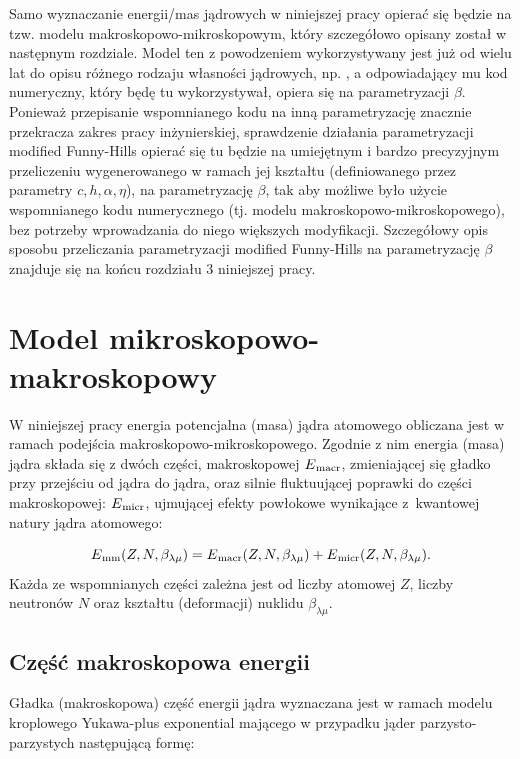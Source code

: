 \documentclass[a4paper,polish,twoside]{article}
\numberwithin{equation}{section}
\begin{document}
Samo wyznaczanie energii/mas jądrowych w niniejszej pracy opierać się będzie na tzw. modelu makroskopowo-mikroskopowym, który szczegółowo opisany został w następnym rozdziale. Model ten z powodzeniem wykorzystywany jest już od wielu lat do opisu różnego rodzaju własności jądrowych, np. \cite{JACHQ,JACHBF,Muntian}, a odpowiadający mu kod numeryczny, który będę tu wykorzystywał, opiera się na parametryzacji $\beta$. Ponieważ przepisanie wspomnianego kodu na inną parametryzację znacznie przekracza zakres pracy inżynierskiej, sprawdzenie działania parametryzacji modified Funny-Hills opierać się tu będzie na umiejętnym i bardzo precyzyjnym przeliczeniu wygenerowanego w ramach jej kształtu (definiowanego przez parametry $c, h, \alpha, \eta$),  na parametryzację $\beta$, tak aby możliwe było użycie wspomnianego kodu numerycznego (tj. modelu makroskopowo-mikroskopowego), bez potrzeby wprowadzania do niego większych modyfikacji. Szczegółowy opis sposobu przeliczania parametryzacji modified Funny-Hills na parametryzację $\beta$ znajduje się na końcu rozdziału 3 niniejszej pracy.

\section{Model mikroskopowo-makroskopowy}

W niniejszej pracy energia potencjalna (masa) jądra atomowego obliczana jest w ramach podejścia makroskopowo-mikroskopowego. Zgodnie z nim energia (masa) jądra składa się z dwóch części, makroskopowej $E\textsubscript{macr}$, zmieniającej się gładko przy przejściu od jądra do jądra, oraz silnie fluktuującej poprawki do części makroskopowej: $E\textsubscript{micr}$, ujmującej efekty powłokowe wynikające z~kwantowej natury jądra atomowego: 

\begin{equation}
E\textsubscript{mm}(Z,N,\beta_{\lambda \mu}) = E\textsubscript{macr}(Z,N,\beta_{\lambda \mu}) + E\textsubscript{micr}(Z,N,\beta_{\lambda \mu}).
\end{equation}
Każda ze wspomnianych części zależna jest od liczby atomowej $Z$, liczby neutronów $N$ oraz kształtu (deformacji) nuklidu $\beta_{\lambda \mu}$.

\subsection{Część makroskopowa energii}
Gładka (makroskopowa) część energii jądra wyznaczana jest w ramach modelu kroplowego Yukawa-plus exponential \cite{Krappe} mającego w przypadku jąder parzysto-parzystych następującą formę:
\end{document}
